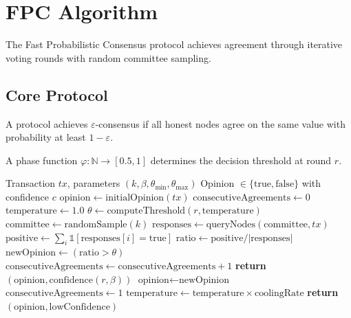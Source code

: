 \section{FPC Algorithm}

\label{sec:algorithm}

The Fast Probabilistic Consensus protocol achieves agreement through iterative voting rounds with random committee sampling.

\subsection{Core Protocol}

\begin{definition}
A protocol achieves $\varepsilon$-consensus if all honest nodes agree on the same value with probability at least $1 - \varepsilon$.
\end{definition}

\begin{definition}
A phase function $\varphi: \mathbb{N} \to [0.5, 1]$ determines the decision threshold at round $r$.
\end{definition}

\begin{algorithm}
\caption{Fast Probabilistic Consensus}
\label{alg:fpc}
\begin{algorithmic}[1]
\REQUIRE Transaction $tx$, parameters $(k, \beta, \theta_{\min}, \theta_{\max})$
\ENSURE Opinion $\in \{\text{true}, \text{false}\}$ with confidence $c$
\STATE $\text{opinion} \gets \text{initialOpinion}(tx)$
\STATE $\text{consecutiveAgreements} \gets 0$
\STATE $\text{temperature} \gets 1.0$
    \STATE $\theta \gets \text{computeThreshold}(r, \text{temperature})$
    \STATE $\text{committee} \gets \text{randomSample}(k)$
    \STATE $\text{responses} \gets \text{queryNodes}(\text{committee}, tx)$
    \STATE $\text{positive} \gets \sum_{i} \mathbb{1}[\text{responses}[i] = \text{true}]$
    \STATE $\text{ratio} \gets \text{positive} / |\text{responses}|$
    \STATE $\text{newOpinion} \gets (\text{ratio} > \theta)$
        \STATE $\text{consecutiveAgreements} \gets \text{consecutiveAgreements} + 1$
            \STATE \textbf{return} $(\text{opinion}, \text{confidence}(r, \beta))$
        \ENDIF
    \ELSE
        \STATE $\text{opinion} \gets \text{newOpinion}$
        \STATE $\text{consecutiveAgreements} \gets 1$
    \ENDIF
    \STATE $\text{temperature} \gets \text{temperature} \times \text{coolingRate}$
\ENDFOR
\STATE \textbf{return} $(\text{opinion}, \text{lowConfidence})$
\end{algorithmic}
\end{algorithm}

